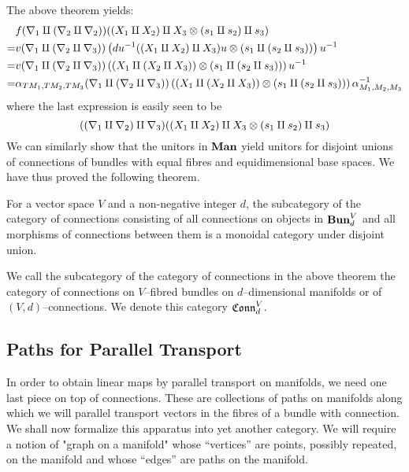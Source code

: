 \documentclass[./Thick_TQFTs_and_Quantum_Information.tex]{subfiles}
\begin{document}
The above theorem yields:
\begin{align*}
  & f(\nabla_1 \amalg (\nabla_2 \amalg \nabla_2))(
      (X_1 \amalg X_2) \amalg X_3
      \otimes (s_1 \amalg s_2) \amalg s_3
      ) \\
  =& v(\nabla_1 \amalg (\nabla_2 \amalg \nabla_3))\left( 
    du^{-1}((X_1 \amalg X_2) \amalg X_3)u
    \otimes (s_1 \amalg (s_2 \amalg s_3))
   \right)u^{-1}\\
  =& v(\nabla_1 \amalg (\nabla_2 \amalg \nabla_3))\left( 
    (X_1 \amalg (X_2 \amalg X_3))
    \otimes (s_1 \amalg (s_2 \amalg s_3))
   \right)u^{-1} \\
  =& \alpha_{TM_1, TM_2, TM_3}(\nabla_1 \amalg (\nabla_2 \amalg \nabla_3))\left( 
    (X_1 \amalg (X_2 \amalg X_3))
    \otimes (s_1 \amalg (s_2 \amalg s_3))
   \right)\alpha_{M_1, M_2, M_3}^{-1}
\end{align*}
where the last expression is easily seen to be
\[
  ((\nabla_1 \amalg \nabla_2) \amalg \nabla_3)(
    (X_1 \amalg X_2) \amalg X_3 \otimes (s_1 \amalg s_2) \amalg s_3
  )
\]
We can similarly show that the unitors in $\textbf{Man}$ yield unitors for disjoint
unions of connections of bundles with equal fibres and equidimensional base
spaces. We have thus proved the following theorem.
\begin{thm}
For a vector space $V$ and a non-negative integer $d$, the subcategory of the
category of connections consisting of all connections on objects in
$\textbf{Bun}_d^{V}$ and all morphisms of connections between them is a monoidal
category under disjoint union.
\end{thm}
\begin{defn}
We call the subcategory of the category of connections in the above theorem the
category of connections on $V$--fibred bundles on $d$--dimensional manifolds or
of $(V, d)$--connections. We denote this category $\mathfrak{Conn}^V_d$.
\end{defn}

\subsection{Paths for Parallel Transport}

In order to obtain linear maps by parallel transport on manifolds, we need one
last piece on top of connections. These are collections of paths on manifolds
along which we will parallel transport vectors in the fibres of a bundle with
connection. We shall now formalize this apparatus into yet another category. We
will require a notion of "graph on a manifold" whose ``vertices'' are points,
possibly repeated, on the manifold and whose ``edges'' are paths on the
manifold.
\end{document}
